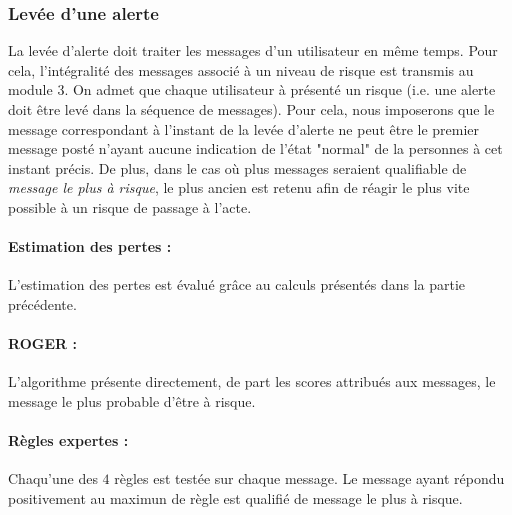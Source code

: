 \subsubsection{Levée d'une alerte}

La levée d'alerte doit traiter les messages d'un utilisateur en même temps. Pour cela, l'intégralité des messages associé à un niveau de risque est transmis au module 3. On admet que chaque utilisateur à présenté un risque (i.e. une alerte doit être levé dans la séquence de messages). Pour cela, nous imposerons que le message correspondant à l'instant de la levée d'alerte ne peut être le premier message posté n'ayant aucune indication de l'état "normal" de la personnes à cet instant précis. De plus, dans le cas où plus messages seraient qualifiable de \emph{message le plus à risque}, le plus ancien est retenu afin de réagir le plus vite possible à un risque de passage à l'acte.


\paragraph{Estimation des pertes : } L'estimation des pertes est évalué grâce au calculs présentés dans la partie précédente.

\paragraph{ROGER : } L'algorithme présente directement, de part les scores attribués aux messages, le message le plus probable d'être à risque.

\paragraph{Règles expertes : } Chaqu'une des $4$ règles est testée sur chaque message. Le message ayant répondu positivement au maximun de règle est qualifié de message le plus à risque.